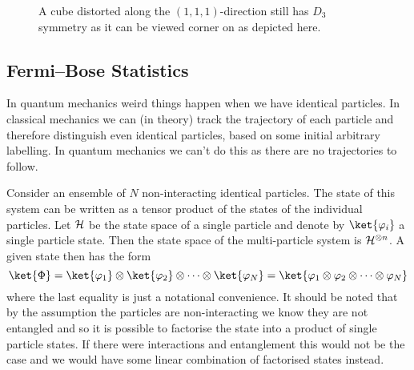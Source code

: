 \begin{figure}
    \caption[A cube distorted along the \((1, 1, 1)\)-direction viewed point on.]{A cube distorted along the \((1, 1, 1)\)-direction still has
        \(D_3\) symmetry as it can be viewed corner on as depicted here.}
    \label{fig:cube corner on}
\end{figure}

\subsection{Fermi--Bose Statistics}
In quantum mechanics weird things happen when we have identical particles.
In classical mechanics we can (in theory) track the trajectory of each
particle and therefore distinguish even identical particles, based on some
initial arbitrary labelling.
In quantum mechanics we can't do this as there are no trajectories to
follow.

Consider an ensemble of \(N\) non-interacting identical particles.
The state of this system can be written as a tensor product of the states of
the individual particles.
Let \(\mathcal{H}\) be the state space of a single particle and denote by
\(\ket{\varphi_i}\) a single particle state.
Then the state space of the multi-particle system is
\(\mathcal{H}^{\otimes n}\).
A given state then has the form
\begin{equation}
    \ket{\Phi} = \ket{\varphi_1} \directproduct \ket{\varphi_2}
    \directproduct \dotsb \directproduct \ket{\varphi_N} = \ket{\varphi_1 \directproduct \varphi_2 \directproduct \dotsb \directproduct \varphi_N}
\end{equation}
where the last equality is just a notational convenience.
It should be noted that by the assumption the particles are non-interacting we know they are not entangled and so it is possible to factorise the state into a product of single particle states.
If there were interactions and entanglement this would not be the case and we would have some linear combination of factorised states instead.

